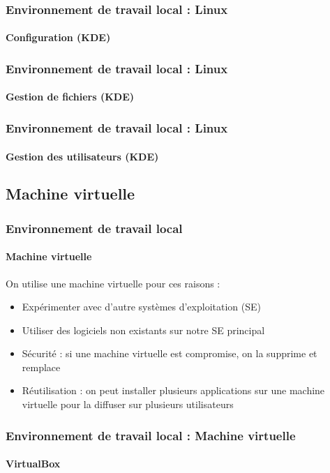 \documentclass[xcolor=table]{beamer}
\begin{document}
\begin{frame}
\frametitle{Environnement de travail local : Linux}
\framesubtitle{Configuration (KDE)}

\begin{center}
\end{center}

\end{frame}

\begin{frame}
\frametitle{Environnement de travail local : Linux}
\framesubtitle{Gestion de fichiers (KDE)}

\begin{center}
\end{center}

\end{frame}

\begin{frame}
\frametitle{Environnement de travail local : Linux}
\framesubtitle{Gestion des utilisateurs (KDE)}

\begin{center}
\end{center}

\end{frame}

\subsection{Machine virtuelle}

\begin{frame}
\frametitle{Environnement de travail local}
\framesubtitle{Machine virtuelle}

On utilise une machine virtuelle pour ces raisons :
\begin{itemize}
	\item Expérimenter avec d'autre systèmes d'exploitation (SE)
	\item Utiliser des logiciels non existants sur notre SE principal
	\item Sécurité : si une machine virtuelle est compromise, on la supprime et remplace
	\item Réutilisation : on peut installer plusieurs applications sur une machine virtuelle pour la diffuser sur plusieurs utilisateurs 
\end{itemize}

\end{frame}

\begin{frame}
\frametitle{Environnement de travail local : Machine virtuelle}
\framesubtitle{VirtualBox}

\begin{center}
\end{center}

\end{frame}
\end{document}
